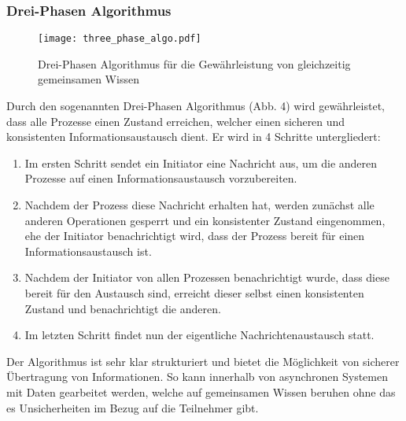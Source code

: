 \subsubsection{Drei-Phasen Algorithmus}
\begin{figure}[H]
\centering
      \texttt{[image: three\_phase\_algo.pdf]}
  \caption{ Drei-Phasen Algorithmus für die Gewährleistung von gleichzeitig gemeinsamen Wissen \cite{kshemkalyani2011distributed}}
\label{pic:lbsn}
\end{figure}
Durch den sogenannten Drei-Phasen Algorithmus (Abb. 4) wird gewährleistet, dass alle Prozesse einen Zustand erreichen, welcher einen sicheren und konsistenten Informationsaustausch dient. Er wird in 4 Schritte untergliedert:
\begin{enumerate}
\item Im ersten Schritt sendet ein Initiator eine Nachricht aus, um die anderen Prozesse auf einen Informationsaustausch vorzubereiten.
\item Nachdem der Prozess diese Nachricht erhalten hat, werden zunächst alle anderen Operationen gesperrt und ein konsistenter Zustand eingenommen, ehe der Initiator benachrichtigt wird, dass der Prozess bereit für einen Informationsaustausch ist.
\item Nachdem der Initiator von allen Prozessen benachrichtigt wurde, dass diese bereit für den Austausch sind, erreicht dieser selbst einen konsistenten Zustand und benachrichtigt die anderen.
\item Im letzten Schritt findet nun der eigentliche Nachrichtenaustausch statt. 
\end{enumerate}

Der Algorithmus ist sehr klar strukturiert und bietet die Möglichkeit von sicherer Übertragung von Informationen. So kann innerhalb von asynchronen Systemen mit Daten gearbeitet werden, welche auf gemeinsamen Wissen beruhen ohne das es Unsicherheiten im Bezug auf die Teilnehmer gibt. 